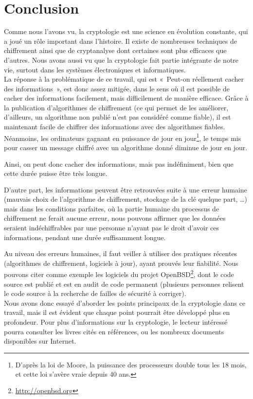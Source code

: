 \chapter{Conclusion}
\thispagestyle{empty}

Comme nous l'avons vu, la cryptologie est une science en
évolution constante, qui a joué un rôle important dans l'histoire.
Il existe de nombreuses techniques de chiffrement ainsi que de
cryptanalyse dont certaines sont plus efficaces que d'autres. Nous avons aussi
vu que la cryptologie fait partie intégrante de notre vie, surtout
dans les systèmes électroniques et informatiques.
\\

La réponse à la problématique de ce travail, qui est «~Peut-on
réellement cacher des informations~», est donc assez mitigée, dans
le sens où il est possible de cacher des informations
facilement, mais difficilement de manière efficace.
Grâce à la publication d'algorithmes de chiffrement (ce qui 
permet de les améliorer, d'ailleurs, un algorithme non
publié n'est pas considéré comme fiable), il est maintenant facile
de chiffrer des informations avec des algorithmes fiables. Néanmoins,
les ordinateurs gagnant en puissance de jour en jour\footnote{D'après la
loi de Moore, la puissance des processeurs double tous les 18
mois, et cette loi s'avère vraie depuis 40 ans.}, le temps mis
pour casser un message chiffré avec un algorithme donné diminue de
jour en jour. %

Ainsi, on peut donc cacher des informations, mais pas
indéfiniment, bien que cette durée puisse être très longue.

D'autre part, les informations peuvent être retrouvées suite à une
erreur humaine (mauvais choix de l'algorithme de chiffrement,
stockage de la clé quelque part, …) 
mais dans les conditions parfaites, où la partie
humaine du processus de chiffrement ne ferait aucune erreur, nous
pouvons affirmer que les données seraient indéchiffrables par une
personne n'ayant pas le droit d'avoir ces informations, pendant
une durée suffisamment longue.

Au niveau des erreurs humaines, il faut veiller à utiliser des
pratiques récentes (algorithmes de chiffrement, logiciels à
jour), ayant
prouvés leur fiabilité. Nous pouvons citer comme exemple les logiciels du
projet OpenBSD\footnote{\url{http://openbsd.org}}, dont le code
source est publié et est en audit de code permanent (plusieurs
personnes relisent le code source à la recherche de failles de
sécurité à corriger).
\\

Nous avons donc essayé d'aborder les points principaux de la
cryptologie dans ce travail, mais il est évident que chaque point
pourrait être développé plus en profondeur. Pour plus
d'informations sur la cryptologie, le lecteur intéressé  pourra consulter les livres
cités en références, ou les nombreux documents
disponibles sur Internet.

